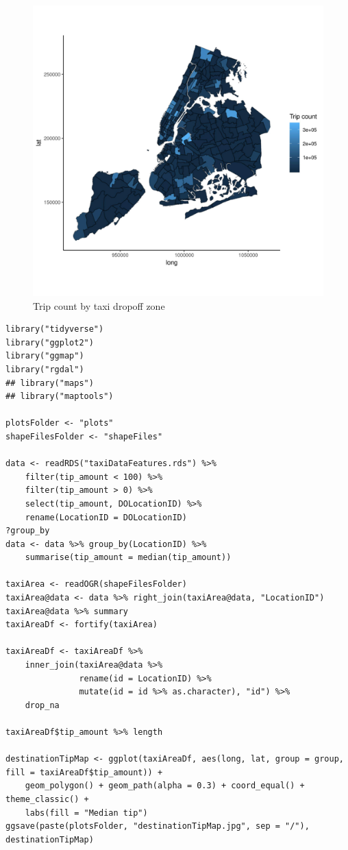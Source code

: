 \documentclass[11pt]{article}
\begin{document}
\begin{figure}[htbp]
\centering
\includegraphics[width=.9\linewidth]{./plots/destinationTripsMap.jpg}
\caption{\label{fig:org8aa1d26}
Trip count by taxi dropoff zone}
\end{figure}

\begin{verbatim}
library("tidyverse")
library("ggplot2")
library("ggmap")
library("rgdal")
## library("maps")
## library("maptools")

plotsFolder <- "plots"
shapeFilesFolder <- "shapeFiles"

data <- readRDS("taxiDataFeatures.rds") %>%
    filter(tip_amount < 100) %>%
    filter(tip_amount > 0) %>%
    select(tip_amount, DOLocationID) %>%
    rename(LocationID = DOLocationID)
?group_by
data <- data %>% group_by(LocationID) %>%
    summarise(tip_amount = median(tip_amount))

taxiArea <- readOGR(shapeFilesFolder)
taxiArea@data <- data %>% right_join(taxiArea@data, "LocationID")
taxiArea@data %>% summary
taxiAreaDf <- fortify(taxiArea)

taxiAreaDf <- taxiAreaDf %>%
    inner_join(taxiArea@data %>%
               rename(id = LocationID) %>%
               mutate(id = id %>% as.character), "id") %>%
    drop_na

taxiAreaDf$tip_amount %>% length

destinationTipMap <- ggplot(taxiAreaDf, aes(long, lat, group = group, fill = taxiAreaDf$tip_amount)) +
    geom_polygon() + geom_path(alpha = 0.3) + coord_equal() + theme_classic() +
    labs(fill = "Median tip")
ggsave(paste(plotsFolder, "destinationTipMap.jpg", sep = "/"), destinationTipMap)

\end{verbatim}
\end{document}
